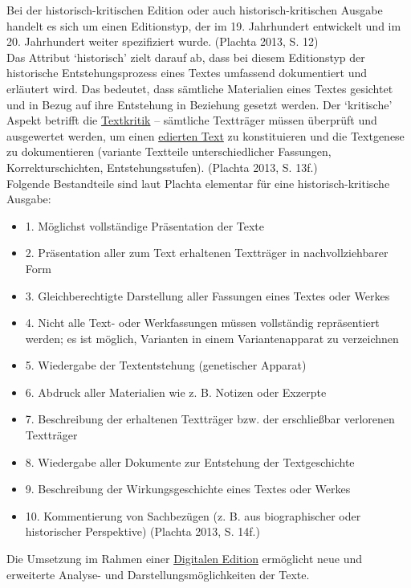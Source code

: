 \documentclass{article}
\begin{document}
    Bei der historisch-kritischen Edition oder auch historisch-kritischen Ausgabe
                  handelt es sich um einen Editionstyp, der im 19. Jahrhundert entwickelt und im 20.
                  Jahrhundert weiter spezifiziert wurde. (Plachta 2013, S. 12)\\
            
        Das Attribut ‘historisch’ zielt darauf ab, dass bei diesem Editionstyp der
                  historische Entstehungsprozess eines Textes umfassend dokumentiert und erläutert
                  wird. Das bedeutet, dass sämtliche Materialien eines Textes gesichtet und in Bezug
                  auf ihre Entstehung in Beziehung gesetzt werden. Der ‘kritische’ Aspekt betrifft
                  die \href{http://gams.uni-graz.at/o:konde.192}{Textkritik} – sämtliche
                  Textträger müssen überprüft und ausgewertet werden, um einen \href{http://gams.uni-graz.at/o:konde.75}{edierten Text} zu konstituieren und die Textgenese zu
                  dokumentieren (variante Textteile unterschiedlicher Fassungen, Korrekturschichten,
                  Entstehungsstufen). (Plachta 2013, S. 13f.)\\
            
         Folgende Bestandteile sind laut Plachta elementar für eine historisch-kritische
                  Ausgabe:\\
            
        \begin{itemize}\item {1. Möglichst vollständige Präsentation der Texte}\item {2. Präsentation aller zum Text erhaltenen Textträger in nachvollziehbarer
                     Form}\item {3. Gleichberechtigte Darstellung aller Fassungen eines Textes oder
                     Werkes}\item {4. Nicht alle Text- oder Werkfassungen müssen vollständig repräsentiert
                     werden; es ist möglich, Varianten in einem Variantenapparat zu
                     verzeichnen}\item {5. Wiedergabe der Textentstehung (genetischer Apparat)}\item {6. Abdruck aller Materialien wie z. B. Notizen oder Exzerpte}\item {7. Beschreibung der erhaltenen Textträger bzw. der erschließbar verlorenen
                     Textträger}\item {8. Wiedergabe aller Dokumente zur Entstehung der Textgeschichte}\item {9. Beschreibung der Wirkungsgeschichte eines Textes oder Werkes}\item {10. Kommentierung von Sachbezügen (z. B. aus biographischer oder
                     historischer Perspektive) (Plachta 2013, S. 14f.)}\end{itemize}Die Umsetzung im Rahmen einer \href{http://gams.uni-graz.at/o:konde.59}{Digitalen
                     Edition} ermöglicht neue und erweiterte Analyse- und
                  Darstellungsmöglichkeiten der Texte.\\
            
\end{document}
